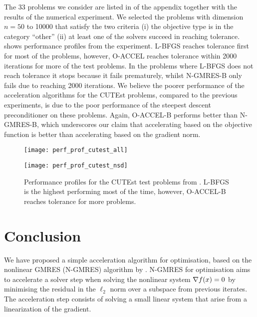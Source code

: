 \documentclass[main.tex]{subfiles}
\begin{document}
The \num{33} problems we consider are listed in
 of the appendix together
with the results of the numerical experiment.  We selected the
problems with dimension $n=50$ to \num{10000} that satisfy the two
criteria (i) the objective type is in the category ``other'' (ii) at
least one of the solvers succeed in reaching tolerance.
 shows performance profiles from the
experiment. L-BFGS reaches tolerance first for most of the problems,
however, O-ACCEL reaches tolerance within \num{2000} iterations for
more of the test problems. In the problems where L-BFGS does not reach
tolerance it stops because it fails prematurely, whilst N-GMRES-B only
fails due to reaching \num{2000} iterations.  We believe the poorer
performance of the acceleration algorithms for the CUTEst problems,
compared to the previous experiments, is due to the poor performance
of the steepest descent preconditioner on these problems.  Again,
O-ACCEL-B performs better than N-GMRES-B, which underscores our claim
that accelerating based on the objective function is better than
accelerating based on the gradient norm.
\begin{figure}[htb]
  \centering
  \begin{minipage}{0.499\textwidth}
    \texttt{[image: perf\_prof\_cutest\_all]}
  \end{minipage}%
  \begin{minipage}{0.499\textwidth}
    \texttt{[image: perf\_prof\_cutest\_nsd]}
  \end{minipage}
  \caption{Performance profiles for the CUTEst test problems from
    .  L-BFGS is the highest
    performing most of the time, however, O-ACCEL-B reaches tolerance
    for more problems.}\label{fig:perf_prof_cutest}
\end{figure}

\section{Conclusion}\label{sec:conclusion}
We have proposed a simple acceleration algorithm for optimisation,
based on the nonlinear GMRES (N-GMRES) algorithm by
\citet{washio1997krylov,sterck2013steepest}.  N-GMRES for optimisation
aims to accelerate a solver step when solving the nonlinear system
$\nabla f(x)=0$ by minimising the residual in the $\ell_2$ norm over
a subspace from previous iterates.  The acceleration step consists of
solving a small linear system that arise from a linearization of the
gradient.
\end{document}
